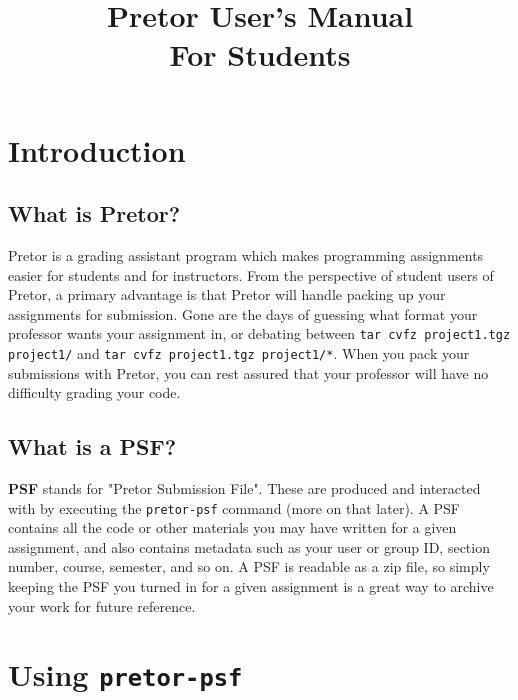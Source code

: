 \documentclass{article}
\title {Pretor User's Manual\\\small{For Students}}
\author {}
\date {}
\begin{document}
\maketitle

\tableofcontents

\section{Introduction}

\subsection{What is Pretor?}

Pretor is a grading assistant program which makes programming assignments
easier for students and for instructors. From the perspective of student users
of Pretor, a primary advantage is that Pretor will handle packing up your
assignments for submission. Gone are the days of guessing what format your
professor wants your assignment in, or debating between \texttt{tar cvfz
project1.tgz project1/} and \texttt{tar cvfz project1.tgz project1/*}. When you
pack your submissions with Pretor, you can rest assured that your professor
will have no difficulty grading your code.

\subsection{What is a PSF?}

\textbf{PSF} stands for "Pretor Submission File". These are produced and
interacted with by executing the \texttt{pretor-psf} command (more on that
later). A PSF contains all the code or other materials you may have written for
a given assignment, and also contains metadata such as your user or group ID,
section number, course, semester, and so on. A PSF is readable as a zip file,
so simply keeping the PSF you turned in for a given assignment is a great way
to archive your work for future reference.


\section{Using \texttt{pretor-psf}}
\end{document}
